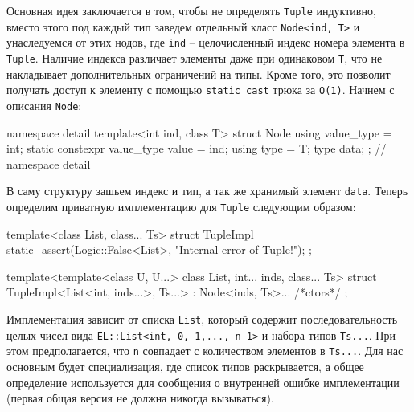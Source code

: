 Основная идея заключается в том, чтобы не определять \verb"Tuple" индуктивно, вместо этого под каждый тип заведем отдельный класс \verb"Node<ind, T>" и унаследуемся от этих нодов, где \verb"ind" -- целочисленный индекс номера элемента в \verb"Tuple".
Наличие индекса различает элементы даже при одинаковом \verb"T", что не накладывает дополнительных ограничений на типы.
Кроме того, это позволит получать доступ к элементу с помощью \verb"static_cast" трюка за \verb"O(1)".
Начнем с описания \verb"Node":
\begin{cppcode}
namespace detail {
template<int ind, class T>
struct Node {
  using value_type = int;
  static constexpr value_type value = ind;
  using type = T;
  type data;
};
} // namespace detail
\end{cppcode}
В саму структуру зашьем индекс и тип, а так же хранимый элемент \verb"data".
Теперь определим приватную имплементацию для \verb"Tuple" следующим образом:
\begin{cppcode}
template<class List, class... Ts>
struct TupleImpl {
  static_assert(Logic::False<List>, "Internal error of Tuple!");
};

template<template<class U, U...> class List, int... inds, class... Ts>
struct TupleImpl<List<int, inds...>, Ts...> : Node<inds, Ts>... {
  /*ctors*/
};
\end{cppcode}
Имплементация зависит от списка \verb"List", который содержит последовательность целых чисел вида \verb"EL::List<int, 0, 1,..., n-1>" и набора типов \verb"Ts...".
При этом предполагается, что \verb"n" совпадает с количеством элементов в \verb"Ts...".
Для нас основным будет специализация, где список типов раскрывается, а общее определение используется для сообщения о внутренней ошибке имплементации (первая общая версия не должна никогда вызываться).

